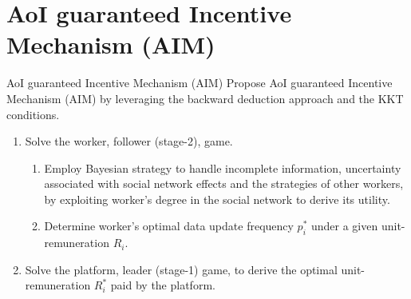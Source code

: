 \documentclass[aspectratio=169,xcolor=dvipsnames]{beamer}
\begin{document}

 \section{AoI guaranteed Incentive Mechanism (AIM)}

 \begin{frame}[fragile]{AoI guaranteed Incentive Mechanism (AIM)}
     \footnotesize %
     Propose AoI guaranteed Incentive Mechanism (AIM) by leveraging the backward deduction approach and the KKT conditions.\\
     \vspace{0.3cm}
         \begin{enumerate}[<+-| alert@+>]
         \setlength{\itemsep}{1em} %
             \item Solve the worker, follower (stage-2), game.\\
             
             \begin{enumerate}
             \vspace{0.3cm}
             \setlength{\itemsep}{1em} %
                 \item Employ Bayesian strategy to handle incomplete information, uncertainty associated with social network effects and the strategies of other workers, by exploiting worker’s degree in the social network to derive its utility.    \\
                 
                 \item Determine worker's optimal data update frequency \(p^*_i\) under a given unit-remuneration \(R_i\).\\
                 
             \end{enumerate}
             
             \item Solve the platform, leader (stage-1) game, to derive the optimal unit-remuneration \(R^*_i\) paid by the platform.
 
         \end{enumerate}
  
\end{frame}
\end{document}
